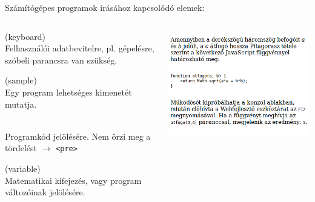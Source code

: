 \begin{frame}
  Számítógépes programok írásához kapcsolódó elemek:
  \begin{columns}[c]
      \begin{description}[m]
        \item[\texttt{<kbd>}] (keyboard) \hfill \\ Felhasználói adatbevitelre, pl. gépelésre, szóbeli parancsra van szükség.
        \item[\texttt{<samp>}] (sample) \hfill \\ Egy program lehetséges kimenetét mutatja.
        \item[\texttt{<code>}] \hfill \\ Programkód jelölésére. Nem őrzi meg a tördelést $\to$ \texttt{<pre>}
        \item[\texttt{<var>}] (variable) \hfill \\ Matematikai kifejezés, vagy program változóinak jelölésére.
      \end{description}
      \includegraphics[width=\textwidth]{kod.png}
  \end{columns} 
\end{frame}

\begin{frame}
  \begin{exampleblock}{}
    \scriptsize
    
  \end{exampleblock}
\end{frame}

